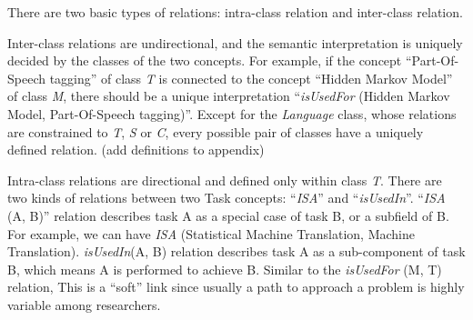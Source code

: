 There are two basic types of relations: intra-class relation and
inter-class relation. 

Inter-class relations are undirectional, and the semantic 
interpretation is uniquely decided by the classes of the two concepts. For example, if the
concept ``Part-Of-Speech tagging'' of class \emph{T} is connected to the concept
``Hidden Markov Model''  of class \emph{M}, there should be a unique interpretation
``\emph{isUsedFor} (Hidden Markov Model, Part-Of-Speech tagging)''. Except for the \emph{Language} class, whose relations are constrained to \emph{T}, \emph{S} or \emph{C}, every possible pair of classes have a uniquely defined relation. (add definitions to appendix)


Intra-class relations are directional and defined only within class \emph{T}. 
There are two kinds of relations between two Task concepts: ``\emph{ISA}'' and 
``\emph{isUsedIn}''.
``\emph{ISA} (A, B)'' relation describes task A as a 
special case of task B, or a subfield of B. For example, 
we can have \emph{ISA} (Statistical Machine Translation, Machine Translation).
\emph{isUsedIn}(A, B) relation describes task A as a sub-component of task B, which
means A is performed to achieve B. Similar to the \emph{isUsedFor} (M, T) relation, 
This is a ``soft'' link since usually a path
to approach a problem is highly variable among researchers.%


